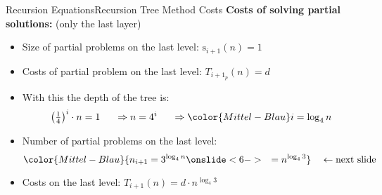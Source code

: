 
\begin{frame}{Recursion Equations}{Recursion Tree Method Costs}
  \textbf{Costs of solving partial solutions:} (only the last layer)
  \begin{itemize}
    \item<2->
      Size of partial problems on the {\color{Mittel-Blau}last level}:
      {\color{Mittel-Blau}$\mathrm{s}_{i+1}(n) = 1$}
    \item<3->
      Costs of partial problem on the {\color{Mittel-Blau}last level}:
      {\color{Mittel-Blau}$T_{i+1_p}(n) = d$}
    \item<4->
      With this the depth of the tree is:
      \begin{displaymath}
        \left(\tfrac{1}{4}\right)^i \cdot n = 1
        \hspace{1.5em}\Rightarrow n = 4^i
        \hspace{1.5em}\Rightarrow\color{Mittel-Blau} i = \log_4 n
      \end{displaymath}
      \vspace{-1em}
    \item<5->
      Number of partial problems on the {\color{Mittel-Blau}last level}:
      \begin{displaymath}
        \color{Mittel-Blau}{n_{i+1} = 3^{\log_4 n}    \onslide<6-> \quad=
          n^{\log_4 3}}  \quad \leftarrow \text{next slide}
      \end{displaymath}
    \item<7->
      Costs on the {\color{Mittel-Blau}last level}:
      {\color{Mittel-Blau}$T_{i+1}(n) = d \cdot n^{\log_4 3}$}
  \end{itemize}
\end{frame}


